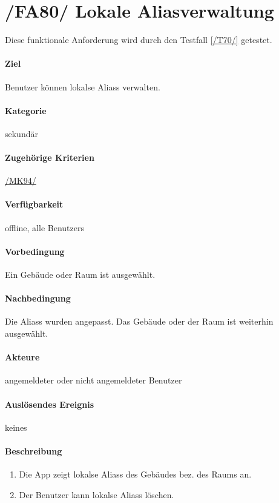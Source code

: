 \section[Lokale Aliasverwaltung]{/FA80/ Lokale Aliasverwaltung}
\label{/FA80/}
Diese funktionale Anforderung wird durch den Testfall \ref{/T70/} getestet.
\paragraph{Ziel}
\Gls{Benutzer} können \glspl{lokal}e \Glspl{Alias} verwalten.
\paragraph{Kategorie}
sekundär
\paragraph{Zugehörige Kriterien}
\hyperref[/MK94/]{/MK94/}
\paragraph{Verfügbarkeit}
\gls{offline}, alle \Glspl{Benutzer}
\paragraph{Vorbedingung}
Ein Gebäude oder Raum ist ausgewählt.
\paragraph{Nachbedingung}
Die \Glspl{Alias} wurden angepasst. Das Gebäude oder der Raum ist weiterhin ausgewählt.
\paragraph{Akteure}
angemeldeter oder nicht angemeldeter \Gls{Benutzer}
\paragraph{Auslösendes Ereignis} keines
\paragraph{Beschreibung}
\begin{enumerate}
      \item Die App zeigt \glspl{lokal}e \Glspl{Alias} des Gebäudes bez. des Raums an.
      \item Der \Gls{Benutzer} kann \glspl{lokal}e \Glspl{Alias} löschen.
\end{enumerate}